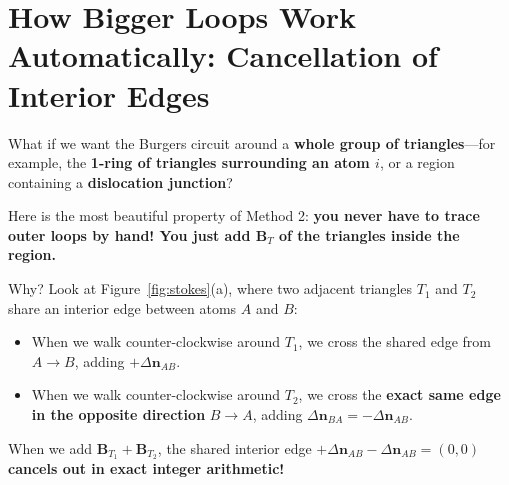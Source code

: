 \documentclass[11pt,a4paper]{article}
\begin{document}
\section{How Bigger Loops Work Automatically: Cancellation of Interior Edges}

What if we want the Burgers circuit around a \textbf{whole group of triangles}---for example, the
\textbf{1-ring of triangles surrounding an atom $i$}, or a region containing a \textbf{dislocation
junction}?

Here is the most beautiful property of Method 2: \textbf{you never have to trace outer loops by hand!
You just add $\bm{B}_T$ of the triangles inside the region.}

Why? Look at Figure~\ref{fig:stokes}(a), where two adjacent triangles $T_1$ and $T_2$ share an
interior edge between atoms $A$ and $B$:
\begin{itemize}[noitemsep]
  \item When we walk counter-clockwise around $T_1$, we cross the shared edge from $A \to B$, adding $+\Delta\bm{n}_{AB}$.
  \item When we walk counter-clockwise around $T_2$, we cross the \textbf{exact same edge in the opposite direction} $B \to A$, adding $\Delta\bm{n}_{BA} = -\Delta\bm{n}_{AB}$.
\end{itemize}
When we add $\bm{B}_{T_1} + \bm{B}_{T_2}$, the shared interior edge $+\Delta\bm{n}_{AB} - \Delta\bm{n}_{AB} = (0,0)$
\textbf{cancels out in exact integer arithmetic!}
\end{document}
